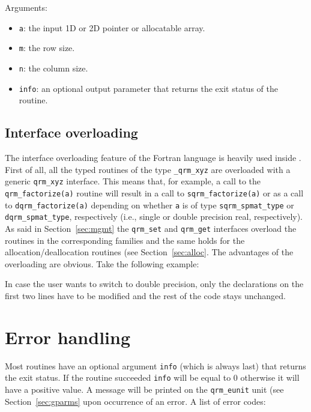\documentclass[11pt]{article}
\begin{document}

\noindent Arguments:
\begin{itemize}
\item \texttt{a}: the input 1D or 2D pointer or allocatable array.
\item \texttt{m}: the row size.
\item \texttt{n}: the column size.
\item \texttt{info}: an optional output parameter that returns the
  exit status of the routine.
\end{itemize}



\subsection{Interface overloading}
\label{sec:iover}

The interface overloading feature of the Fortran language is heavily
used inside \qrm. First of all, all the typed routines of the type
\texttt{\_qrm\_xyz} are overloaded with a generic \texttt{qrm\_xyz}
interface. This means that, for example, a call to the
\texttt{qrm\_factorize(a)} routine will result in a call to
\texttt{sqrm\_factorize(a)} or as a call to
\texttt{dqrm\_factorize(a)} depending on whether \texttt{a} is of
type \texttt{sqrm\_spmat\_type} or  \texttt{dqrm\_spmat\_type},
respectively (i.e., single or double precision real, respectively).
As said in Section~\ref{sec:mgmt} the \texttt{qrm\_set} and
\texttt{qrm\_get} interfaces overload the routines in the
corresponding families and the same holds for the
allocation/deallocation routines (see Section~\ref{sec:alloc}. The
advantages of the overloading are obvious. Take the following example:



In case the user wants to switch to double precision, only the
declarations on the first two lines have to be modified and the rest
of the code stays unchanged. 


\section{Error handling}
\label{sec:error}

Most \qrm routines have an optional argument \texttt{info} (which is
always last) that returns the exit status. If the routine succeeded
\texttt{info} will be equal to 0 otherwise it will have a positive
value. A message will be printed on the \texttt{qrm\_eunit} unit (see
Section~\ref{sec:gparms} upon occurrence of an error. A list of error codes:
\end{document}
